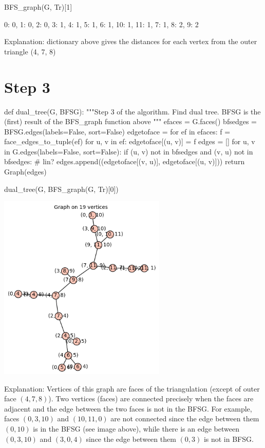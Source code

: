 \begin{sageCell}
    BFS_graph(G, Tr)[1]
\end{sageCell}

\begin{outCell}
    {0: 0, 1: 0, 2: 0, 3: 1, 4: 1, 5: 1, 6: 1, 10: 1, 11: 1, 7: 1, 8: 2, 9: 2}
\end{outCell}
Explanation: dictionary above gives the distances for each vertex from the outer triangle (4, 7, 8)

\section*{Step 3}

\begin{sageCell}
def dual_tree(G, BFSG):
    """Step 3 of the algorithm. Find dual tree. BFSG is the (first) result of the BFS_graph function above
    """
    efaces = G.faces()
    bfsedges = BFSG.edges(labels=False, sort=False)
    edgetoface = {}
    for ef in efaces:
        f = face_edges_to_tuple(ef)
        for u, v in ef:
            edgetoface[(u, v)] = f
    edges = []
    for u, v in G.edges(labels=False, sort=False):
        if (u, v) not in bfsedges and (v, u) not in bfsedges: # lin?
            edges.append((edgetoface[(v, u)], edgetoface[(u, v)]))
    return Graph(edges)
\end{sageCell}

\begin{sageCell}
    dual_tree(G, BFS_graph(G, Tr)[0])
\end{sageCell}
\begin{outImage}
    \includegraphics[width=0.6\textwidth]{Images/BalancedSeparators/dual_tree.png}
\end{outImage}
Explanation: Vertices of this graph are faces of the triangulation (except of outer face $(4, 7, 8)$). Two vertices (faces) are connected precisely when the faces are adjacent and the edge between the two faces is not in the BFSG.
For example, faces $(0, 3, 10)$ and $(10, 11, 0)$ are not connected since the edge between them $(0, 10)$ is in the BFSG (see image above), while there is an edge between $(0, 3, 10)$ and $(3, 0, 4)$ since the edge between them $(0, 3)$ is not in BFSG.

